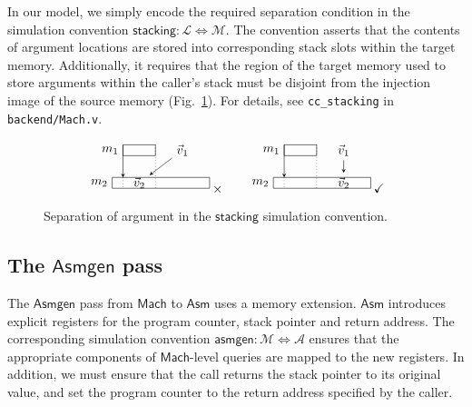 \documentclass[sigplan,screen,review]{acmart}
\newcommand{\kw}[1]{\ensuremath{ \mathsf{#1} }}
\newenvironment{optional}{}{}
\begin{document}
\begin{optional}
In our model,
we simply encode the required separation condition
in the simulation convention
$\kw{stacking} : \mathcal{L} \Leftrightarrow \mathcal{M}$.
The convention
asserts that the contents of argument locations
are stored into corresponding stack slots
within the target memory.
Additionally, it
requires that the region of the target memory
used to store arguments within the caller's stack
must be disjoint from the injection image of the source memory
(Fig.~\ref{fig:stacking}).
For details,
see \texttt{cc\_stacking} in \texttt{backend/Mach.v}.

\begin{figure}
\[
  \begin{tikzpicture}[scale=0.3,>=stealth]
    \draw ( 1,3) rectangle +(3,1); \node[left] at (1,3.5) {$m_1$};
    \draw ( 0,0) rectangle +(9,1); \node[left] at (0,0.5) {$m_2$};
    \node (V1) at (6.5,3.5) {$\vec{v}_1$};
    \node (V2) at (2.5,0.5) {$\vec{v}_2$};
    \draw[->] (1,4) -- (1,1); \draw[dotted] (1,1) -- (1,0); \draw[dotted] (4,4) -- (4,0);
    \draw[->] (V1) -- (V2);
  \end{tikzpicture}
  \:{\times}
  \qquad
  \begin{tikzpicture}[scale=0.3,>=stealth]
    \draw ( 1,3) rectangle +(3,1); \node[left] at (1,3.5) {$m_1$};
    \draw ( 0,0) rectangle +(9,1); \node[left] at (0,0.5) {$m_2$};
    \node (V1) at (6.5,3.5) {$\vec{v}_1$};
    \node (V2) at (6.5,0.5) {$\vec{v}_2$};
    \draw[->] (1,4) -- (1,1); \draw[dotted] (1,1) -- (1,0); \draw[dotted] (4,4) -- (4,0);
    \draw[->] (V1) -- (V2);
  \end{tikzpicture}
  \:{\checkmark}
\]
  \caption{Separation of argument
    in the \kw{stacking} simulation convention.}
  \label{fig:stacking}
\end{figure}


\subsection{The \kw{Asmgen} pass} \label{sec:asmgen} %

The \kw{Asmgen} pass from \kw{Mach} to \kw{Asm}
uses a memory extension.
\kw{Asm} introduces explicit registers for the
program counter, stack pointer and return address.
The corresponding simulation convention
$\kw{asmgen} : \mathcal{M} \Leftrightarrow \mathcal{A}$
ensures that the appropriate components of
\kw{Mach}-level queries are mapped to the new registers.
In addition,
we must ensure that the call returns the stack pointer
to its original value,
and set the program counter to the return address
specified by the caller.


\end{optional}
\end{document}
